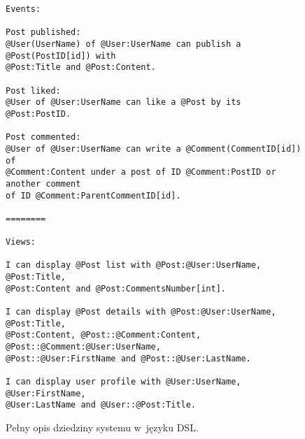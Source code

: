 \begin{figure}[!ht]
\begin{verbatim}
Events:

Post published:
@User(UserName) of @User:UserName can publish a @Post(PostID[id]) with
@Post:Title and @Post:Content.

Post liked:
@User of @User:UserName can like a @Post by its @Post:PostID.

Post commented:
@User of @User:UserName can write a @Comment(CommentID[id]) of
@Comment:Content under a post of ID @Comment:PostID or another comment
of ID @Comment:ParentCommentID[id].

========

Views:

I can display @Post list with @Post:@User:UserName, @Post:Title,
@Post:Content and @Post:CommentsNumber[int].

I can display @Post details with @Post:@User:UserName, @Post:Title,
@Post:Content, @Post::@Comment:Content, @Post::@Comment:@User:UserName,
@Post::@User:FirstName and @Post::@User:LastName.

I can display user profile with @User:UserName, @User:FirstName,
@User:LastName and @User::@Post:Title.

\end{verbatim}
\caption{
 Pełny opis dziedziny systemu w~języku DSL.
}
\label{fig:dsl:model_dsl}
\end{figure}
